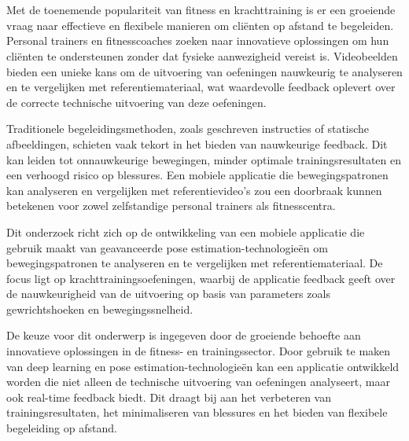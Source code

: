 
\chapter{}%
\label{ch:inleiding}

Met de toenemende populariteit van fitness en krachttraining is er een groeiende vraag naar effectieve en flexibele manieren om cliënten op afstand te begeleiden. 
Personal trainers en fitnesscoaches zoeken naar innovatieve oplossingen om hun cliënten te ondersteunen zonder dat fysieke aanwezigheid vereist is. 
Videobeelden bieden een unieke kans om de uitvoering van oefeningen nauwkeurig te analyseren en te vergelijken met referentiemateriaal, wat waardevolle feedback oplevert over de correcte technische uitvoering van deze oefeningen.

\medskip

Traditionele begeleidingsmethoden, zoals geschreven instructies of statische afbeeldingen, schieten vaak tekort in het bieden van nauwkeurige feedback. 
Dit kan leiden tot onnauwkeurige bewegingen, minder optimale trainingsresultaten en een verhoogd risico op blessures. 
Een mobiele applicatie die bewegingspatronen kan analyseren en vergelijken met referentievideo’s zou een doorbraak kunnen betekenen voor zowel zelfstandige personal trainers als fitnesscentra.

\medskip

Dit onderzoek richt zich op de ontwikkeling van een mobiele applicatie die gebruik maakt van geavanceerde pose estimation-technologieën om bewegingspatronen te analyseren en te vergelijken met referentiemateriaal. De focus ligt op krachttrainingsoefeningen, waarbij de applicatie feedback geeft over de nauwkeurigheid van de uitvoering op basis van parameters zoals gewrichtshoeken en bewegingssnelheid.

\medskip

De keuze voor dit onderwerp is ingegeven door de groeiende behoefte aan innovatieve oplossingen in de fitness- en trainingssector. Door gebruik te maken van deep learning en pose estimation-technologieën kan een applicatie ontwikkeld worden die niet alleen de technische uitvoering van oefeningen analyseert, maar ook real-time feedback biedt. Dit draagt bij aan het verbeteren van trainingsresultaten, het minimaliseren van blessures en het bieden van flexibele begeleiding op afstand.

